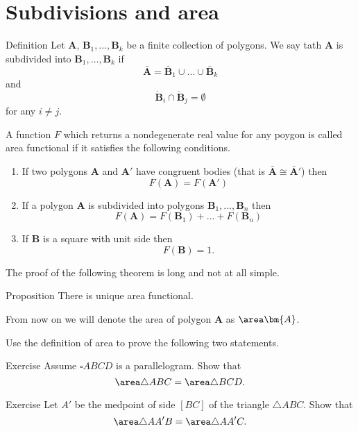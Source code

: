 {\section*{Subdivisions and area}

\begin{thm}{Definition}
Let $\bm{A}$, $\bm{B}_1,\dots,\bm{B}_k$
be a finite collection of polygons.
We say tath $\bm{A}$ 
is subdivided into $\bm{B}_1,\dots,\bm{B}_k$
if 
\[\bar{\bm{A}}=\bar{\bm{B}}_1\cup\dots\cup\bar{\bm{B}}_k\]
and 
\[\mathring{\bm{B}}_i\cap\mathring{\bm{B}}_j=\emptyset\]
for any $i\ne j$.
\end{thm}

A function $F$ which returns a nondegenerate real value for any poygon 
is called area functional if it satisfies the following conditions.

\begin{enumerate}
\item If  two polygons $\bm{A}$ and $\bm{A}'$ have congruent bodies (that is $\bar{\bm{A}}\cong \bar{\bm{A}}'$)
then 
\[F(\bm{A})=F(\bm{A}')\]
\item If a polygon $\bm{A}$ is subdivided into polygons $\bm{B}_1, \dots,\bm{B}_n$
then 
\[F(\bm{A})=F(\bm{B}_1)+\dots+F(\bm{B}_n)\]
\item If $\bm{B}$ is a square with unit side then 
\[F(\bm{B})=1.\]
\end{enumerate}

The proof of the following theorem is long and not at all simple.

\begin{thm}{Proposition}
There is unique area functional.
\end{thm}

From now on we will denote the area of polygon $\bm{A}$ as $\area \bm{A}$.

Use the definition of area to prove the following two statements.


\begin{thm}{Exercise}
Assume $\square ABCD$ is a parallelogram.
Show that 
\[\area\triangle ABC=\area\triangle BCD.\]

\end{thm}

\begin{thm}{Exercise}
Let $A'$ be the medpoint of side $[BC]$ of the triangle $\triangle ABC$.
Show that 
\[\area\triangle AA'B=\area\triangle AA'C.\]

\end{thm}



















}
